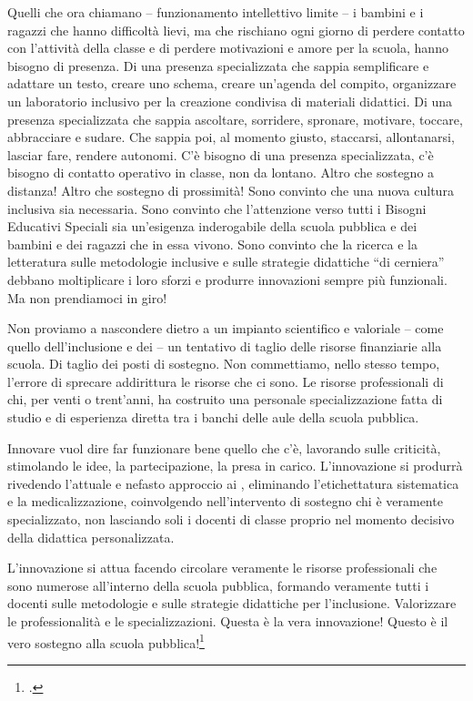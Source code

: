 Quelli che ora chiamano  – funzionamento intellettivo limite – i bambini e i ragazzi che hanno difficoltà lievi, ma che rischiano ogni giorno di perdere contatto con l'attività della classe e di perdere motivazioni e amore per la scuola, hanno bisogno di presenza. Di una presenza specializzata che sappia semplificare e adattare un testo, creare uno schema, creare un'agenda del compito, organizzare un laboratorio inclusivo per la creazione condivisa di materiali didattici. Di una presenza specializzata che sappia ascoltare, sorridere, spronare, motivare, toccare, abbracciare e sudare. Che sappia poi, al momento giusto, staccarsi, allontanarsi, lasciar fare, rendere autonomi. C'è bisogno di una presenza specializzata, c'è bisogno di contatto operativo in classe, non da lontano. Altro che sostegno a distanza! Altro che sostegno di prossimità!
Sono convinto che una nuova cultura inclusiva sia necessaria. Sono convinto che l'attenzione verso tutti i Bisogni Educativi Speciali sia un'esigenza inderogabile della scuola pubblica e dei bambini e dei ragazzi che in essa vivono. Sono convinto che la ricerca e la letteratura sulle metodologie inclusive e sulle strategie didattiche “di cerniera” debbano moltiplicare i loro sforzi e produrre innovazioni sempre più funzionali. Ma non prendiamoci in giro!

Non proviamo a nascondere dietro a un impianto scientifico e valoriale – come quello dell'inclusione e dei  – un tentativo di taglio delle risorse finanziarie alla scuola. Di taglio dei posti di sostegno. Non commettiamo, nello stesso tempo, l'errore di sprecare addirittura le risorse che ci sono. Le risorse professionali di chi, per venti o trent'anni, ha costruito una personale specializzazione fatta di studio e di esperienza diretta tra i banchi delle aule della scuola pubblica.

Innovare vuol dire far funzionare bene quello che c'è, lavorando sulle criticità, stimolando le idee, la partecipazione, la presa in carico. L'innovazione si produrrà rivedendo l'attuale e nefasto approccio ai , eliminando l'etichettatura sistematica e la medicalizzazione, coinvolgendo nell'intervento di sostegno chi è veramente specializzato, non lasciando soli i docenti di classe proprio nel momento decisivo della didattica personalizzata.

L'innovazione si attua facendo circolare veramente le risorse professionali che sono numerose all'interno della scuola pubblica, formando veramente tutti i docenti sulle metodologie e sulle strategie didattiche per l'inclusione. Valorizzare le professionalità e le specializzazioni. Questa è la vera innovazione! Questo è il vero sostegno alla scuola pubblica!\footcite{scataglini1}

